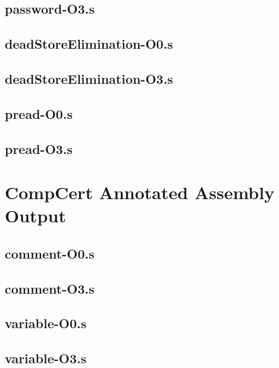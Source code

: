 \begin{appendices}
\section{password-O3.s}


\section{deadStoreElimination-O0.s}

\section{deadStoreElimination-O3.s}


\section{pread-O0.s}

\section{pread-O3.s}


\chapter{CompCert Annotated Assembly Output}
\label{app:compCertAnnotatedAssembly}
\lstset{language=[x64]Assembler}
\section{comment-O0.s}

\section{comment-O3.s}


\section{variable-O0.s}

\section{variable-O3.s}



\end{appendices}

